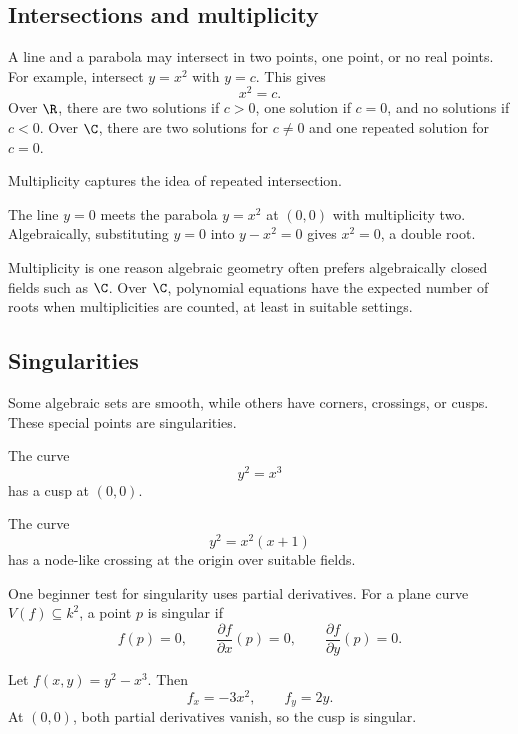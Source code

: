 \subsection{Intersections and multiplicity}

A line and a parabola may intersect in two points, one point, or no real points.
For example, intersect $y=x^2$ with $y=c$. This gives
\[
x^2=c.
\]
Over $\R$, there are two solutions if $c>0$, one solution if $c=0$, and no
solutions if $c<0$. Over $\C$, there are two solutions for $c\neq 0$ and one
repeated solution for $c=0$.

Multiplicity captures the idea of repeated intersection.

\begin{example}
The line $y=0$ meets the parabola $y=x^2$ at $(0,0)$ with multiplicity two.
Algebraically, substituting $y=0$ into $y-x^2=0$ gives $x^2=0$, a double root.
\end{example}

Multiplicity is one reason algebraic geometry often prefers algebraically
closed fields such as $\C$. Over $\C$, polynomial equations have the expected
number of roots when multiplicities are counted, at least in suitable settings.

\subsection{Singularities}

Some algebraic sets are smooth, while others have corners, crossings, or cusps.
These special points are singularities.

\begin{example}
The curve
\[
y^2=x^3
\]
has a cusp at $(0,0)$.
\end{example}

\begin{example}
The curve
\[
y^2=x^2(x+1)
\]
has a node-like crossing at the origin over suitable fields.
\end{example}

One beginner test for singularity uses partial derivatives. For a plane curve
$V(f)\subseteq k^2$, a point $p$ is singular if
\[
f(p)=0,\qquad \frac{\partial f}{\partial x}(p)=0,\qquad
\frac{\partial f}{\partial y}(p)=0.
\]

\begin{example}
Let $f(x,y)=y^2-x^3$. Then
\[
f_x=-3x^2,\qquad f_y=2y.
\]
At $(0,0)$, both partial derivatives vanish, so the cusp is singular.
\end{example}

